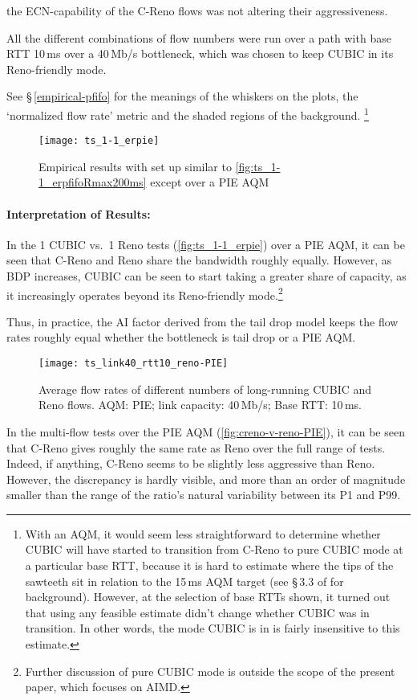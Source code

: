 the ECN-capability of the C-Reno flows was not altering their aggressiveness.

All the different combinations of flow numbers were run over a path with base RTT 10\,ms over a 40\,Mb/s bottleneck, which was chosen to keep CUBIC in its Reno-friendly mode. 

See \S\,\ref{empirical-pfifo} for the meanings of the whiskers on the plots, the `normalized flow rate' metric and the shaded regions of the background.%
\footnote{With an AQM, it would seem less straightforward to determine whether CUBIC will have started to transition from C-Reno to pure CUBIC mode at a particular base RTT, because it is hard to estimate where the tips of the sawteeth sit in relation to the 15\,ms AQM target (see \S\,3.3 of \cite{Briscoe21c:pi2param} for background). However, at the selection of base RTTs shown, it turned out that using any feasible estimate didn't change whether CUBIC was in transition. In other words, the mode CUBIC is in is fairly insensitive to this estimate.}

\begin{figure}
	\centering
	\texttt{[image: ts\_1-1\_erpie]}
	\caption{Empirical results with set up similar to \autoref{fig:ts_1-1_erpfifoRmax200ms} except over a PIE AQM}\label{fig:ts_1-1_erpie}
\end{figure}

\paragraph{Interpretation of Results:} In the 1 CUBIC vs.\ 1 Reno tests (\autoref{fig:ts_1-1_erpie}) over a PIE AQM, it can be seen that C-Reno and Reno share the bandwidth roughly equally. However, as BDP increases, CUBIC can be seen to start taking a greater share of capacity, as it increasingly operates beyond its Reno-friendly mode.\footnote{Further discussion of pure CUBIC mode is outside the scope of the present paper, which focuses on AIMD.}

Thus, in practice, the AI factor derived from the tail drop model keeps the flow rates roughly equal whether the bottleneck is tail drop or a PIE AQM. 

\begin{figure}
	\centering
	\texttt{[image: ts\_link40\_rtt10\_reno-PIE]}
	\caption{Average flow rates of different numbers of long-running CUBIC and Reno flows. AQM: PIE; link capacity: 40\,Mb/s; Base RTT: 10\,ms.}\label{fig:creno-v-reno-PIE}
\end{figure}

In the multi-flow tests over the PIE AQM (\autoref{fig:creno-v-reno-PIE}), it can be seen that C-Reno gives roughly the same rate as Reno over the full range of tests. Indeed, if anything, C-Reno seems to be slightly less aggressive than Reno. However, the discrepancy is hardly visible, and more than an order of magnitude smaller than the range of the ratio's natural variability between its P1 and P99. 

